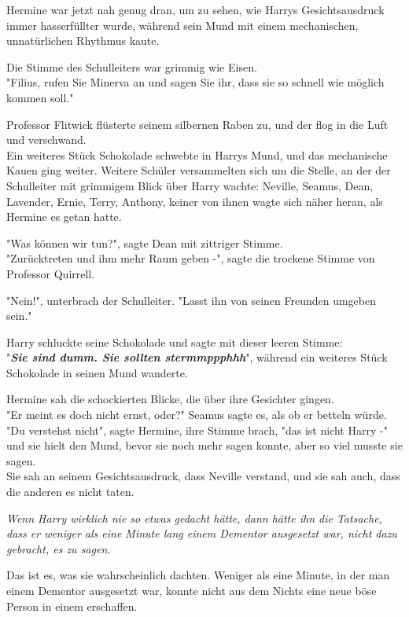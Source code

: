 {Hermine war jetzt nah genug dran, um zu sehen, wie Harrys Gesichtsausdruck immer hasserfüllter wurde, während sein Mund mit einem mechanischen, unnatürlichen Rhythmus kaute.

Die Stimme des Schulleiters war grimmig wie Eisen.\\ "Filius, rufen Sie Minerva an und sagen Sie ihr, dass sie so schnell wie möglich kommen soll."

Professor Flitwick flüsterte seinem silbernen Raben zu, und der flog in die Luft und verschwand.\\ Ein weiteres Stück Schokolade schwebte in Harrys Mund, und das mechanische Kauen ging weiter. Weitere Schüler versammelten sich um die Stelle, an der der Schulleiter mit grimmigem Blick über Harry wachte: Neville, Seamus, Dean, Lavender, Ernie, Terry, Anthony, keiner von ihnen wagte sich näher heran, als Hermine es getan hatte.

"Was können wir tun?", sagte Dean mit zittriger Stimme.\\ "Zurücktreten und ihm mehr Raum geben -", sagte die trockene Stimme von Professor Quirrell.

"Nein!", unterbrach der Schulleiter. "Lasst ihn von seinen Freunden umgeben sein."

Harry schluckte seine Schokolade und sagte mit dieser leeren Stimme:\\ "\textbf{\emph{Sie sind dumm. Sie sollten stermmppphhh}}", während ein weiteres Stück Schokolade in seinen Mund wanderte.

Hermine sah die schockierten Blicke, die über ihre Gesichter gingen.\\ "Er meint es doch nicht ernst, oder?" Seamus sagte es, als ob er betteln würde.\\ "Du verstehst nicht", sagte Hermine, ihre Stimme brach, "das ist nicht Harry -"\\ und sie hielt den Mund, bevor sie noch mehr sagen konnte, aber so viel musste sie sagen.\\ Sie sah an seinem Gesichtsausdruck, dass Neville verstand, und sie sah auch, dass die anderen es nicht taten.

\emph{Wenn Harry wirklich nie so etwas gedacht hätte, dann hätte ihn die Tatsache, dass er weniger als eine Minute lang einem Dementor ausgesetzt war, nicht dazu gebracht, es zu sagen.}

Das ist es, was sie wahrscheinlich dachten. Weniger als eine Minute, in der man einem Dementor ausgesetzt war, konnte nicht aus dem Nichts eine neue böse Person in einem erschaffen.

}
